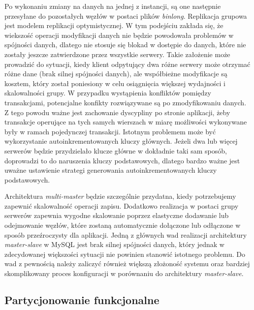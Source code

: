 Po wykonaniu zmiany na danych na jednej z instancji, są one następnie przesyłane do pozostałych węzłów w postaci plików \textit{binlong}. Replikacja grupowa jest modelem replikacji optymistycznej. W tym podejściu zakłada się, że wiekszość operacji modyfikacji danych nie będzie powodowała problemów w spójności danych, dlatego nie stosuje się blokad w dostępie do danych, które nie zostały jeszcze zatwierdzone przez wszystkie serwery. Takie założenie może prowadzić do sytuacji, kiedy klient odpytujący dwa różne serwery może otrzymać różne dane (brak silnej spójności danych), ale współbieżne modyfikacje są kosztem, który został poniesiony w celu osiągnięcia większej wydajności i skalowalności grupy. W przypadku wystąpienia konfliktów pomiędzy transakcjami, potencjalne konfikty rozwiązywane są po zmodyfikowaniu danych. Z tego powodu ważne jest zachowanie dyscypliny po stronie aplikacji, żeby transakcje operujące na tych samych wierszach w miarę możliwości wykonywane były w ramach pojedynczej transakcji. Istotnym problemem może być wykorzystanie autoinkrementowanych kluczy głównych. Jeżeli dwa lub więcej serwerów będzie przydzielało klucze główne w dokładnie taki sam sposób, doprowadzi to do naruszenia kluczy podstawowych, dlatego bardzo ważne jest uważne ustawienie strategi generowania autoinkrementowanych kluczy podstawowych.

Architektura \textit{multi-master} będzie szczególnie przydatna, kiedy potrzebujemy zapewnić skalowalność operacji zapisu. Dodatkowo realizacja w postaci grupy serwerów zapewnia wygodne skalowanie poprzez elastyczne dodawanie lub odejmowanie węzłów, które zostaną automatycznie dołączone lub odłączone w sposób przeźroczysty dla aplikacji. Jedną z głównych wad realizacji architektury \textit{master-slave} w MySQL jest brak silnej spójności danych, który jednak w zdecydowanej większości sytuacji nie powinien stanowić istotnego problemu. Do wad z pewnością należy zaliczyć również większą złożoność systemu oraz bardziej skomplikowany proces konfiguracji w porównaniu do architektury \textit{master-slave}.


\subsection{Partycjonowanie funkcjonalne}

